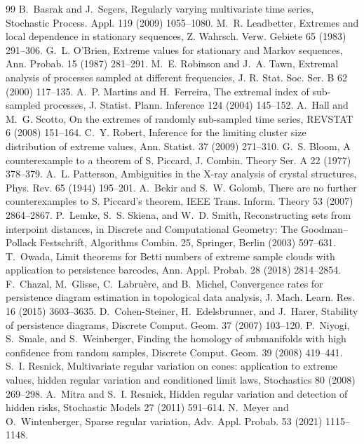 \documentclass[11pt]{article}
\theoremstyle{definition}
\begin{document}
\begin{thebibliography}{99}
 B.~Basrak and J.~Segers, Regularly varying multivariate time series, Stochastic Process. Appl. 119 (2009) 1055--1080.
 M.~R. Leadbetter, Extremes and local dependence in stationary sequences, Z. Wahrsch. Verw. Gebiete 65 (1983) 291--306.
 G.~L. O'Brien, Extreme values for stationary and Markov sequences, Ann. Probab. 15 (1987) 281--291.
 M.~E. Robinson and J.~A. Tawn, Extremal analysis of processes sampled at different frequencies, J. R. Stat. Soc. Ser. B 62 (2000) 117--135.
 A.~P. Martins and H.~Ferreira, The extremal index of sub-sampled processes, J. Statist. Plann. Inference 124 (2004) 145--152.
 A.~Hall and M.~G. Scotto, On the extremes of randomly sub-sampled time series, REVSTAT 6 (2008) 151--164.
 C.~Y. Robert, Inference for the limiting cluster size distribution of extreme values, Ann. Statist. 37 (2009) 271--310.
 G.~S. Bloom, A counterexample to a theorem of S. Piccard, J. Combin. Theory Ser. A 22 (1977) 378--379.
 A.~L. Patterson, Ambiguities in the X-ray analysis of crystal structures, Phys. Rev. 65 (1944) 195--201.
 A.~Bekir and S.~W. Golomb, There are no further counterexamples to S. Piccard's theorem, IEEE Trans. Inform. Theory 53 (2007) 2864--2867.
 P.~Lemke, S.~S. Skiena, and W.~D. Smith, Reconstructing sets from interpoint distances, in Discrete and Computational Geometry: The Goodman--Pollack Festschrift, Algorithms Combin. 25, Springer, Berlin (2003) 597--631.
 T.~Owada, Limit theorems for Betti numbers of extreme sample clouds with application to persistence barcodes, Ann. Appl. Probab. 28 (2018) 2814--2854.
 F.~Chazal, M.~Glisse, C.~Labru\`ere, and B.~Michel, Convergence rates for persistence diagram estimation in topological data analysis, J. Mach. Learn. Res. 16 (2015) 3603--3635.
 D.~Cohen-Steiner, H.~Edelsbrunner, and J.~Harer, Stability of persistence diagrams, Discrete Comput. Geom. 37 (2007) 103--120.
 P.~Niyogi, S.~Smale, and S.~Weinberger, Finding the homology of submanifolds with high confidence from random samples, Discrete Comput. Geom. 39 (2008) 419--441.
 S.~I. Resnick, Multivariate regular variation on cones: application to extreme values, hidden regular variation and conditioned limit laws, Stochastics 80 (2008) 269--298.
 A.~Mitra and S.~I. Resnick, Hidden regular variation and detection of hidden risks, Stochastic Models 27 (2011) 591--614.
 N.~Meyer and O.~Wintenberger, Sparse regular variation, Adv. Appl. Probab. 53 (2021) 1115--1148.

\end{thebibliography}
\end{document}
